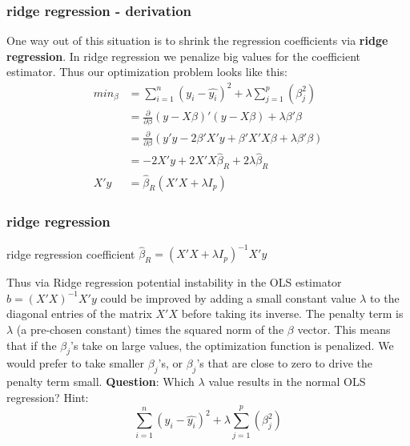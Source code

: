 \documentclass{beamer}
\begin{document}
\begin{frame}
\frametitle{ridge regression - derivation}
One way out of this situation is to shrink the regression coefficients via \textbf{ridge regression}.
\newline
In ridge regression we penalize big values for the coefficient estimator. Thus our optimization problem looks like this:
\begin{align*} 
min_{\beta} &= \sum_{i=1}^n (y_i - \hat{y_i})^2 + \lambda \sum_{j=1}^p (\beta_j^2) \\
&=\frac{\partial }{\partial \beta} (y - X\beta)'(y - X\beta)  + \lambda \beta'\beta \\
    &= \frac{\partial }{\partial \beta} ( y'y -2\beta'X'y + \beta'X'X\beta + \lambda \beta'\beta ) \\
  &= -2X'y   +2 X'X\hat{\beta}_{R}+ 2\lambda\hat{\beta}_{R} \\
  X'y &= \hat{\beta}_{R} (X'X + \lambda I_p)
\end{align*}

\end{frame}

\begin{frame}
\frametitle{ridge regression}
\begin{block}{ridge regression coefficient}
$  \hat{\beta}_{R} = (X'X + \lambda I_p)^{-1}X'y $
\end{block}
Thus via Ridge regression potential instability in the OLS estimator $b =(X'X )^{-1}X'y $ could be improved by adding a small constant value $\lambda$ to the diagonal entries of the matrix $X′X$ before taking its inverse.
\newline
The penalty term is $\lambda$ (a pre-chosen constant) times the squared norm of the $\beta$ vector. This means that if the $\beta_j$'s take on large values, the optimization function is penalized. We would prefer to take smaller $\beta_j$'s, or $\beta_j$'s that are close to zero to drive the penalty term small.
\newline
\newline
\textbf{Question}: Which $\lambda$ value results in the normal OLS regression?
\newline
Hint:
\begin{equation*}
\sum_{i=1}^n (y_i - \hat{y_i})^2 + \lambda \sum_{j=1}^p (\beta_j^2) 
\end{equation*} 
\end{frame}
\end{document}
